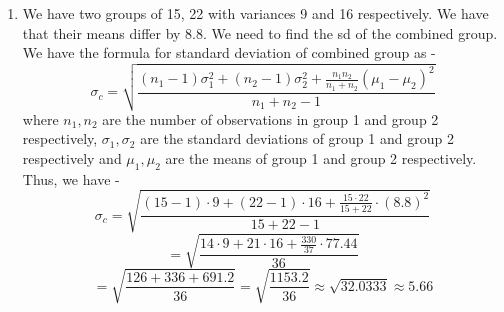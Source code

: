 \begin{enumerate}
    Now, we need to find the mean deviation about median. Thus, we have -
    \[MD = \frac{\sum f_i |x_i - \text{Median}|}{N}\]
    \[= \frac{110 |22.5 - 30| + 90 |27.5 - 30| + 75 |32.5 - 30| + 55 |37.5 - 30| + 40 |42.5 - 30| + 30 |47.5 - 30|}{400}\]
    \[= \frac{110 \cdot 7.5 + 90 \cdot 2.5 + 75 \cdot 2.5 + 55 \cdot 7.5 + 40 \cdot 12.5 + 30 \cdot 17.5}{400}\]
    \[= \frac{825 + 225 + 187.5 + 412.5 + 500 + 525}{400} = \frac{2675}{400} = 6.6875\]
    \[\boxed{MD \approx 6.69
    }\]
    Now, we need to find the sd for the distribution. We have the formula for standard deviation as -
    \[\sigma = \sqrt{\frac{\sum f_i x_i^2}{N} - \mu^2}\]
    where $f_i$ is the frequency of class $i$, $x_i$ is the mid-point of class $i$ and $N$ is the total number of observations. \\
    We have the mean as -
    \[\mu = \frac{\sum f_i x_i}{N} = \frac{110 \cdot 22.5 + 90 \cdot 27.5 + 75 \cdot 32.5 + 55 \cdot 37.5 + 40 \cdot 42.5 + 30 \cdot 47.5}{400}\]
    \[= \frac{2475 + 2475 + 2437.5 + 2062.5 + 1700 + 1425}{400} = \frac{15575}{400} = 38.9375\]
    Now, we have -
    \[\sum f_i x_i^2 = 110 \cdot (22.5)^2 + 90 \cdot (27.5)^2 + 75 \cdot (32.5)^2 + 55 \cdot (37.5)^2 + 40 \cdot (42.5)^2 + 30 \cdot (47.5)^2\]
    \[= 110 \cdot 506.25 + 90 \cdot 756.25 + 75 \cdot 1056.25 + 55 \cdot 1406.25 + 40 \cdot 1806.25 + 30 \cdot 2256.25\]
    \[= 55687.5 + 68062.5 + 79218.75 + 77343.75 + 72250 + 67687.5 = 420250\]
    Thus, we have the sd as -
    \[\sigma = \sqrt{\frac{420250}{400} - (38.9375)^2} = \sqrt{1050.625 - 1516.015625}\approx 7.29 \]
    \[\boxed{\sigma \approx 7.29
    }\]
    \item We have two groups of 15, 22 with variances 9 and 16 respectively. We have that their means differ by 8.8. We need to find the sd of the combined group.
    We have the formula for standard deviation of combined group as -
    \[\sigma_c = \sqrt{\frac{(n_1 - 1) \sigma_1^2 + (n_2 - 1) \sigma_2^2 + \frac{n_1 n_2}{n_1 + n_2} (\mu_1 - \mu_2)^2}{n_1 + n_2 - 1}}\]
    where $n_1, n_2$ are the number of observations in group 1 and group 2 respectively, $\sigma_1, \sigma_2$ are the standard deviations of group 1 and group 2 respectively and $\mu_1, \mu_2$ are the means of group 1 and group 2 respectively. \\
    Thus, we have -
    \[\sigma_c = \sqrt{\frac{(15 - 1) \cdot 9 + (22 - 1) \cdot 16 + \frac{15 \cdot 22}{15 + 22} \cdot (8.8)^2}{15 + 22 - 1}}\]
    \[= \sqrt{\frac{14 \cdot 9 + 21 \cdot 16 + \frac{330}{37} \cdot 77.44}{36}}\]
    \[= \sqrt{\frac{126 + 336 + 691.2}{36}} = \sqrt{\frac{1153.2}{36}} \approx \sqrt{32.0333} \approx 5.66\]

\end{enumerate}
